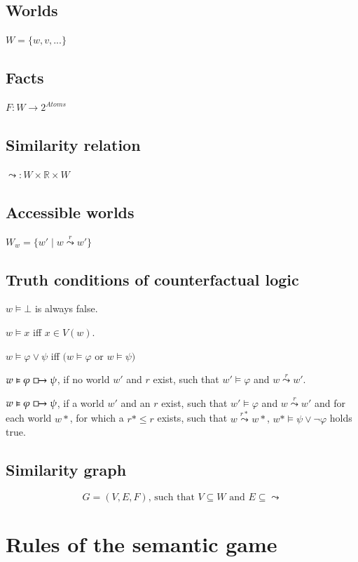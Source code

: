 \documentclass[a4paper,american]{paper}
\begin{document}
\subsection{Worlds}
$W = \{w,v,...\}$

\subsection{Facts}
$F \colon W \rightarrow 2^{Atoms}$

\subsection{Similarity relation}
$\leadsto \colon W\times \mathbb{R} \times W$

\subsection{Accessible worlds}
$W_w = \{w'\mid w \overset{r}{\leadsto} w'\}$

\subsection{Truth conditions of counterfactual logic}
$w \vDash \bot$ is always false.

$w \vDash x$ iff $x \in V(w)$.

$w \vDash \varphi \vee \psi$ iff $(w \vDash \varphi$ or $w \vDash \psi)$

$w \vDash \varphi \boxright \psi$, if no world $w'$ and $r$ exist, such that $w' \vDash \varphi$ and $w\overset{r}{\leadsto} w'$.

$w \vDash \varphi \boxright \psi$, if a world $w'$ and an $r$ exist, such that $w'\vDash \varphi$ and $w\overset{r}{\leadsto} w'$ and for each world $w*$, for which a $r*\leq r$ exists, such that $w\overset{r*}{\leadsto} w*$, $w*\vDash\psi\vee\neg\varphi$ holds true.
\subsection{Similarity graph}
\begin{equation}
	G = (V,E,F)\text{, such that }V \subseteq W\text{ and }E \subseteq \leadsto
\end{equation}

\section*{Rules of the semantic game}
\end{document}
